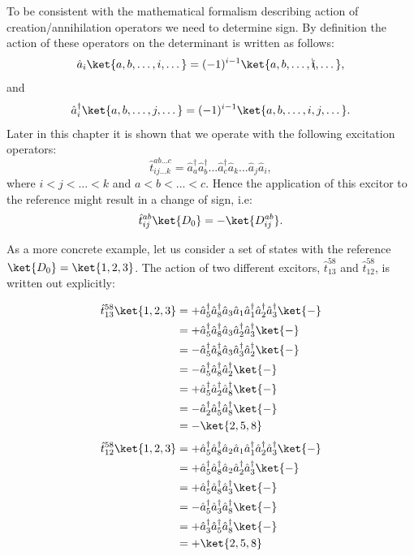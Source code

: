 \documentclass[twoside,english]{uiofysmaster}
\begin{document}
To be consistent with the mathematical formalism describing action of creation/annihilation operators we need to determine sign. By definition the action of these operators on the determinant is written as follows:
\[
\hat{a}_i \ket{a,b,\dots, i,\dots} = (-1)^{i-1} \ket{a,b,\dots, \bcancel{i},\dots},
\]
and
\[
\hat{a}^\dagger_i \ket{a,b,\dots, j, \dots} = (-1)^{i-1} \ket{a,b,\dots, i,j,\dots}.
\]
Later in this chapter it is shown that we operate with the following excitation operators:
\[
\hat{t}_{ij...k}^{ab...c} = \hat{a}^\dagger_a \hat{a}^\dagger_b ... \hat{a}^\dagger_c \hat{a}_k ... \hat{a}_j \hat{a}_i,
\]
where $i<j<...<k$ and $a<b<...<c$.
Hence the application of this excitor to the reference might result in a change of sign, i.e:
\[
\hat{t}_{ij}^{ab} \ket{D_0} = -\ket{D_{ij}^{ab}}.
\]

As a more concrete example, let us consider a set of states with the reference $\ket{D_0} = \ket{1,2,3}$. The action of two different excitors, $ \hat{t}_{13}^{58}$ and $\hat{t}_{12}^{58}$, is written out explicitly:

\begin{align*}
\hat{t}_{13}^{58} \ket{1,2,3} &= + \hat{a}^\dagger_5 \hat{a}^\dagger_8 \hat{a}_3 \hat{a}_1 \hat{a}^\dagger_1 \hat{a}^\dagger_2 \hat{a}^\dagger_3 \ket{-}\\
&= + \hat{a}^\dagger_5 \hat{a}^\dagger_8 \hat{a}_3 \hat{a}^\dagger_2 \hat{a}^\dagger_3 \ket{-}\\
&= - \hat{a}^\dagger_5 \hat{a}^\dagger_8 \hat{a}_3 \hat{a}^\dagger_3 \hat{a}^\dagger_2 \ket{-}\\
&= - \hat{a}^\dagger_5 \hat{a}^\dagger_8 \hat{a}^\dagger_2 \ket{-}\\
&= + \hat{a}^\dagger_5 \hat{a}^\dagger_2 \hat{a}^\dagger_8 \ket{-}\\
&= - \hat{a}^\dagger_2 \hat{a}^\dagger_5 \hat{a}^\dagger_8 \ket{-}\\
&= - \ket{2,5,8}\\
\end{align*}
\begin{align*}
\hat{t}_{12}^{58} \ket{1,2,3} &= + \hat{a}^\dagger_5 \hat{a}^\dagger_8 \hat{a}_2 \hat{a}_1 \hat{a}^\dagger_1 \hat{a}^\dagger_2 \hat{a}^\dagger_3 \ket{-}\\
&= + \hat{a}^\dagger_5 \hat{a}^\dagger_8 \hat{a}_2 \hat{a}^\dagger_2 \hat{a}^\dagger_3 \ket{-}\\
&= + \hat{a}^\dagger_5 \hat{a}^\dagger_8 \hat{a}^\dagger_3 \ket{-}\\
&= - \hat{a}^\dagger_5 \hat{a}^\dagger_3 \hat{a}^\dagger_8 \ket{-}\\
&= + \hat{a}^\dagger_3 \hat{a}^\dagger_5 \hat{a}^\dagger_8 \ket{-}\\
&= + \ket{2,5,8}
\end{align*}
\end{document}
